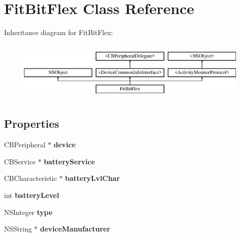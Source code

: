 \hypertarget{interface_fit_bit_flex}{\section{Fit\-Bit\-Flex Class Reference}
\label{interface_fit_bit_flex}
}
Inheritance diagram for Fit\-Bit\-Flex\-:\begin{figure}[H]
\begin{center}
\leavevmode
\includegraphics[height=2.901554cm]{interface_fit_bit_flex}
\end{center}
\end{figure}
\subsection*{Properties}
\begin{DoxyCompactItemize}
\item 
\hypertarget{interface_fit_bit_flex_ac539ad853d5729137679c3293cba75f5}{C\-B\-Peripheral $\ast$ {\bfseries device}}\label{interface_fit_bit_flex_ac539ad853d5729137679c3293cba75f5}

\item 
\hypertarget{interface_fit_bit_flex_af23b05b17587b9810d93909f279cca75}{C\-B\-Service $\ast$ {\bfseries battery\-Service}}\label{interface_fit_bit_flex_af23b05b17587b9810d93909f279cca75}

\item 
\hypertarget{interface_fit_bit_flex_a0d5ca990dbff1852b3d8a07faa91234b}{C\-B\-Characteristic $\ast$ {\bfseries battery\-Lvl\-Char}}\label{interface_fit_bit_flex_a0d5ca990dbff1852b3d8a07faa91234b}

\item 
\hypertarget{interface_fit_bit_flex_a6141ecb075c9553d179dc5210d2c4952}{int {\bfseries battery\-Level}}\label{interface_fit_bit_flex_a6141ecb075c9553d179dc5210d2c4952}

\item 
\hypertarget{interface_fit_bit_flex_a77895e42698dfb9e32ea3511dd68aa3e}{N\-S\-Integer {\bfseries type}}\label{interface_fit_bit_flex_a77895e42698dfb9e32ea3511dd68aa3e}

\item 
\hypertarget{interface_fit_bit_flex_a3b4fca544836750998946aab4d4c8a3d}{N\-S\-String $\ast$ {\bfseries device\-Manufacturer}}\label{interface_fit_bit_flex_a3b4fca544836750998946aab4d4c8a3d}

\end{DoxyCompactItemize}
